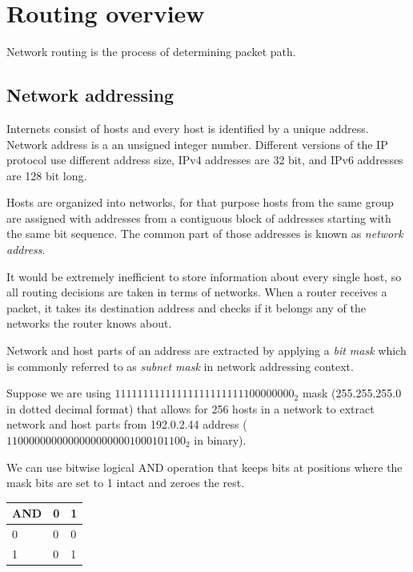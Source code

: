 %

\chapter{Routing overview}

Network routing is the process of determining packet path.

\section{Network addressing}

Internets consist of hosts and every host is identified by a unique address. Network address is a an unsigned integer number.
Different versions of the IP protocol use different address size, IPv4 addresses are 32 bit, and IPv6 addresses are 128 bit long.

Hosts are organized into networks, for that purpose hosts from the same group are assigned with addresses from a contiguous block
of addresses starting with the same bit sequence. The common part of those addresses is known as \emph{network address}.

It would be extremely inefficient to store information about every single host, so all routing decisions
are taken in terms of networks. When a router receives a packet, it takes its destination address and
checks if it belongs any of the networks the router knows about.

Network and host parts of an address are extracted by applying a \emph{bit mask} which is commonly referred to as 
\emph{subnet mask} in network addressing context.

Suppose we are using $11111111111111111111111100000000_2$ mask (255.255.255.0 in dotted decimal format) that allows for 256 hosts
in a network to extract network and host parts from 192.0.2.44 address ($11000000000000000000001000101100_2$ in binary).

We can use bitwise logical AND operation that keeps bits at positions where the mask bits are set to 1 intact and zeroes the rest.

\begin{tabular}{|l|l|l|}
\hline
AND & 0 & 1 \\
\hline
0 & 0 & 0 \\
\hline
1 & 0 & 1 \\
\hline
\end{tabular}

